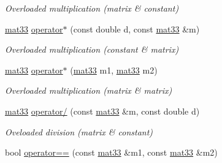 \begin{DoxyCompactItemize}
\begin{DoxyCompactList}\small\item\em \-Overloaded multiplication (matrix \& constant) \end{DoxyCompactList}\item 
\hypertarget{classutil_1_1math_1_1mat33_abff2a6293ffbe0b6077ece21356b6a3f}{\hyperlink{classutil_1_1math_1_1mat33}{mat33} \hyperlink{classutil_1_1math_1_1mat33_abff2a6293ffbe0b6077ece21356b6a3f}{operator$\ast$} (const double d, const \hyperlink{classutil_1_1math_1_1mat33}{mat33} \&m)}\label{classutil_1_1math_1_1mat33_abff2a6293ffbe0b6077ece21356b6a3f}

\begin{DoxyCompactList}\small\item\em \-Overloaded multiplication (constant \& matrix) \end{DoxyCompactList}\item 
\hypertarget{classutil_1_1math_1_1mat33_af9316334ff81fdbaf28a6912113da00a}{\hyperlink{classutil_1_1math_1_1mat33}{mat33} \hyperlink{classutil_1_1math_1_1mat33_af9316334ff81fdbaf28a6912113da00a}{operator$\ast$} (\hyperlink{classutil_1_1math_1_1mat33}{mat33} m1, \hyperlink{classutil_1_1math_1_1mat33}{mat33} m2)}\label{classutil_1_1math_1_1mat33_af9316334ff81fdbaf28a6912113da00a}

\begin{DoxyCompactList}\small\item\em \-Overloaded multiplication (matrix \& matrix) \end{DoxyCompactList}\item 
\hypertarget{classutil_1_1math_1_1mat33_a1f1bc7d69850efd0d2c34173b284252b}{\hyperlink{classutil_1_1math_1_1mat33}{mat33} \hyperlink{classutil_1_1math_1_1mat33_a1f1bc7d69850efd0d2c34173b284252b}{operator/} (const \hyperlink{classutil_1_1math_1_1mat33}{mat33} \&m, const double d)}\label{classutil_1_1math_1_1mat33_a1f1bc7d69850efd0d2c34173b284252b}

\begin{DoxyCompactList}\small\item\em \-Oveloaded division (matrix \& constant) \end{DoxyCompactList}\item 
\hypertarget{classutil_1_1math_1_1mat33_aeb05da60a81312c57d0bb5b723b7d5a3}{bool \hyperlink{classutil_1_1math_1_1mat33_aeb05da60a81312c57d0bb5b723b7d5a3}{operator==} (const \hyperlink{classutil_1_1math_1_1mat33}{mat33} \&m1, const \hyperlink{classutil_1_1math_1_1mat33}{mat33} \&m2)}\label{classutil_1_1math_1_1mat33_aeb05da60a81312c57d0bb5b723b7d5a3}


\end{DoxyCompactItemize}
